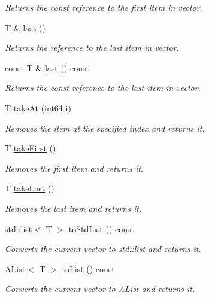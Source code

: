 \begin{DoxyCompactItemize}
\begin{DoxyCompactList}\small\item\em Returns the const reference to the first item in vector. \end{DoxyCompactList}\item 
T \& \mbox{\hyperlink{class_a_vector_a0465c474ee53f57eb8817a531ac530b2}{last}} ()
\begin{DoxyCompactList}\small\item\em Returns the reference to the last item in vector. \end{DoxyCompactList}\item 
const T \& \mbox{\hyperlink{class_a_vector_afbdc200be19695bebbbc54dce5693f98}{last}} () const
\begin{DoxyCompactList}\small\item\em Returns the const reference to the last item in vector. \end{DoxyCompactList}\item 
T \mbox{\hyperlink{class_a_vector_af0be6b4c55d4e732f23e237ff299caa8}{take\+At}} (int64 i)
\begin{DoxyCompactList}\small\item\em Removes the item at the specified index and returns it. \end{DoxyCompactList}\item 
T \mbox{\hyperlink{class_a_vector_ae2cad9bb2968e2fe2c96554f6b36c4a9}{take\+First}} ()
\begin{DoxyCompactList}\small\item\em Removes the first item and returns it. \end{DoxyCompactList}\item 
T \mbox{\hyperlink{class_a_vector_abaa54e33aa13edba5b2e4cad679f5c1b}{take\+Last}} ()
\begin{DoxyCompactList}\small\item\em Removes the last item and returns it. \end{DoxyCompactList}\item 
std\+::list$<$ T $>$ \mbox{\hyperlink{class_a_vector_a1d4f18d5930903cde500ef51266f91c5}{to\+Std\+List}} () const
\begin{DoxyCompactList}\small\item\em Converts the current vector to std\+::list and returns it. \end{DoxyCompactList}\item 
\mbox{\hyperlink{class_a_list}{A\+List}}$<$ T $>$ \mbox{\hyperlink{class_a_vector_a3cdb7d87eb47e91445928d54972197fc}{to\+List}} () const
\begin{DoxyCompactList}\small\item\em Converts the current vector to \mbox{\hyperlink{class_a_list}{A\+List}} and returns it. \end{DoxyCompactList}\end{DoxyCompactItemize}


